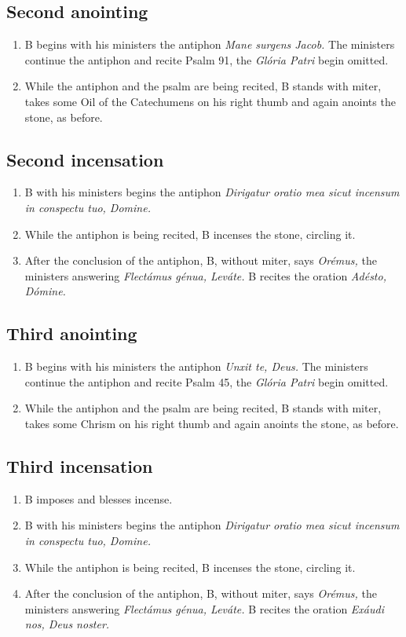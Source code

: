 \documentclass[twocolumn]{report}
\begin{document}
\subsection*{Second anointing}
\begin{enumerate}
	\item B begins with his ministers the antiphon \textit{Mane surgens Jacob.} The ministers continue the antiphon and recite Psalm 91, the \textit{Glória Patri} begin omitted.
	\item While the antiphon and the psalm are being recited, B stands with miter, takes some Oil of the Catechumens on his right thumb and again anoints the stone, as before.
\end{enumerate}
\subsection*{Second incensation}
\begin{enumerate}
	\item B with his ministers begins the antiphon \textit{Dirigatur oratio mea sicut incensum in conspectu tuo, Domine.}
	\item While the antiphon is being recited, B incenses the stone, circling it.
	\item After the conclusion of the antiphon, B, without miter, says \textit{Orémus,} the ministers answering \textit{Flectámus génua, Leváte.} B recites the oration \textit{Adésto, Dómine.}
\end{enumerate}
\subsection*{Third anointing}
\begin{enumerate}
	\item B begins with his ministers the antiphon \textit{Unxit te, Deus.} The ministers continue the antiphon and recite Psalm 45, the \textit{Glória Patri} begin omitted.
	\item While the antiphon and the psalm are being recited, B stands with miter, takes some Chrism on his right thumb and again anoints the stone, as before.
\end{enumerate}
\subsection*{Third incensation}
\begin{enumerate}
	\item B imposes and blesses incense.
	\item B with his ministers begins the antiphon \textit{Dirigatur oratio mea sicut incensum in conspectu tuo, Domine.}
	\item While the antiphon is being recited, B incenses the stone, circling it.
	\item After the conclusion of the antiphon, B, without miter, says \textit{Orémus,} the ministers answering \textit{Flectámus génua, Leváte.} B recites the oration \textit{Exáudi nos, Deus noster.}
\end{enumerate}
\end{document}

